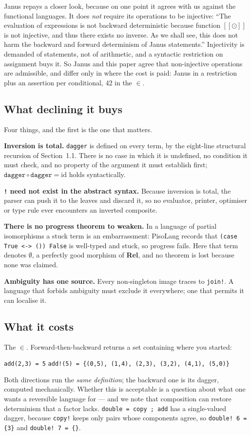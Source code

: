\documentclass[runningheads,envcountsame]{llncs}
\newcommand{\Rel}{\textbf{Rel}}
\begin{document}
Janus repays a closer look, because on one point it agrees with us against the
functional languages. It does \emph{not} require its operations to be injective:
``The evaluation of expressions is not backward deterministic because function
$[\![\odot]\!]$ is not injective, and thus there exists no inverse. As we shall
see, this does not harm the backward and forward determinism of Janus
statements.'' Injectivity is demanded of statements, not of arithmetic, and a
syntactic restriction on assignment buys it. So Janus and this paper agree that
non-injective operations are admissible, and differ only in where the cost is
paid: Janus in a restriction plus an assertion per conditional, 42 in the $\in$.

\subsection{What declining it buys}

Four things, and the first is the one that matters.

\textbf{Inversion is total.} \texttt{dagger} is defined on every term, by the
eight-line structural recursion of Section~1.1. There is no case in which it is
undefined, no condition it must check, and no property of the argument it must
establish first; $\texttt{dagger} \circ \texttt{dagger} = \mathrm{id}$ holds
syntactically.

\textbf{\texttt{!} need not exist in the abstract syntax.} Because inversion is
total, the parser can push it to the leaves and discard it, so no evaluator,
printer, optimiser or type rule ever encounters an inverted composite.

\textbf{There is no progress theorem to weaken.} In a language of partial
isomorphisms a stuck term is an embarrassment: PisoLang records that
\texttt{(case True <-> ()) False} is well-typed and stuck, so progress fails. Here
that term denotes $\emptyset$, a perfectly good morphism of \Rel{}, and no theorem
is lost because none was claimed.

\textbf{Ambiguity has one source.} Every non-singleton image traces to
\texttt{join!}. A language that forbids ambiguity must exclude it everywhere; one
that permits it can localise it.

\subsection{What it costs}

The $\in$. Forward-then-backward returns a set containing where you started:
\begin{center}\small
\texttt{add(2,3) = 5} \qquad
\texttt{add!(5) = \{(0,5), (1,4), (2,3), (3,2), (4,1), (5,0)\}}
\end{center}
Both directions run the \emph{same definition}; the backward one is its dagger,
computed mechanically. Whether this is acceptable is a question about what one
wants a reversible language for --- and we note that composition can restore
determinism that a factor lacks. \texttt{double = copy ; add} has a single-valued
dagger, because \texttt{copy!} keeps only pairs whose components agree, so
\texttt{double! 6 = \{3\}} and \texttt{double! 7 = \{\}}.
\end{document}
